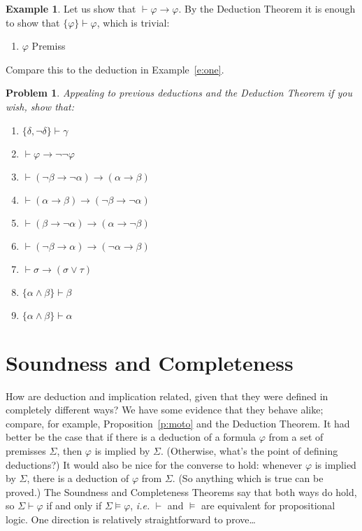 \documentclass[12pt]{amsbook}
\newcommand{\proves}{\vdash}
\theoremstyle{plain}
\newtheorem{prob}[thm]{Problem}
\theoremstyle{definition}
\newtheorem{exmp}{Example}[chapter]
\theoremstyle{remark}
\begin{document}
\begin{exmp} \label{e:five}
Let us show that $\proves \varphi \to \varphi$.  By the Deduction Theorem it is enough to show that $\{ \varphi \} \proves \varphi$,  which is trivial:
\begin{enumerate}
\item $\varphi$ \hfill Premiss
\end{enumerate}
Compare this to the deduction in Example~\ref{e:one}.
\end{exmp}

\begin{prob} \label{p:prov}
Appealing to previous deductions and the Deduction Theorem if you wish,  show that:
\begin{enumerate}
\item $\{ \delta, \lnot\delta \} \proves \gamma$
\item $\proves \varphi \to \lnot\lnot \varphi$
\item $\proves (\lnot \beta \to \lnot \alpha) \to (\alpha \to \beta)$
\item $\proves (\alpha \to \beta) \to (\lnot \beta \to \lnot \alpha)$
\item $\proves (\beta \to \lnot \alpha) \to (\alpha \to \lnot \beta)$
\item $\proves (\lnot \beta \to \alpha) \to (\lnot \alpha \to \beta)$
\item $\proves \sigma \to (\sigma \lor \tau)$
\item $\{ \alpha \land \beta \} \proves \beta$
\item $\{ \alpha \land \beta \} \proves \alpha$
\end{enumerate}
\end{prob}



%
%

\chapter{Soundness and Completeness} \label{ch:four}

How are deduction and implication related,  given that they were defined in completely different ways?   We have some evidence that they behave alike;  compare,  for example,  Proposition~\ref{p:moto} and the Deduction Theorem.  It had better be the case that if there is a deduction of a formula $\varphi$ from a set of premisses $\Sigma$,  then $\varphi$ is implied by $\Sigma$.  (Otherwise,  what's the point of defining deductions?)  It would also be nice for the converse to hold:  whenever $\varphi$ is implied by $\Sigma$,  there is a deduction of $\varphi$ from $\Sigma$.  (So anything which is true can be proved.)  The Soundness and Completeness Theorems say that both ways do hold,  so $\Sigma \proves \varphi$ if and only if $\Sigma \models \varphi$,  {\em i.e.\/} $\proves$ and $\models$ are equivalent for propositional logic.  One direction is relatively straightforward to prove\dots
\end{document}
